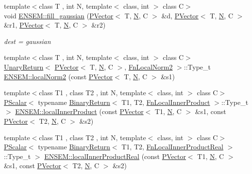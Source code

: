 \begin{DoxyCompactItemize}
{\footnotesize template$<$class T , int N, template$<$ class, int $>$ class C$>$ }\\void \mbox{\hyperlink{group__primvector_ga54096af2b60c9427d37bd363286b820f}{E\+N\+S\+E\+M\+::fill\+\_\+gaussian}} (\mbox{\hyperlink{classENSEM_1_1PVector}{P\+Vector}}$<$ T, \mbox{\hyperlink{operator__name__util_8cc_a7722c8ecbb62d99aee7ce68b1752f337}{N}}, C $>$ \&d, \mbox{\hyperlink{classENSEM_1_1PVector}{P\+Vector}}$<$ T, \mbox{\hyperlink{operator__name__util_8cc_a7722c8ecbb62d99aee7ce68b1752f337}{N}}, C $>$ \&r1, \mbox{\hyperlink{classENSEM_1_1PVector}{P\+Vector}}$<$ T, \mbox{\hyperlink{operator__name__util_8cc_a7722c8ecbb62d99aee7ce68b1752f337}{N}}, C $>$ \&r2)
\begin{DoxyCompactList}\small\item\em dest = gaussian \end{DoxyCompactList}\item 
{\footnotesize template$<$class T , int N, template$<$ class, int $>$ class C$>$ }\\\mbox{\hyperlink{structENSEM_1_1UnaryReturn}{Unary\+Return}}$<$ \mbox{\hyperlink{classENSEM_1_1PVector}{P\+Vector}}$<$ T, \mbox{\hyperlink{operator__name__util_8cc_a7722c8ecbb62d99aee7ce68b1752f337}{N}}, C $>$, \mbox{\hyperlink{structENSEM_1_1FnLocalNorm2}{Fn\+Local\+Norm2}} $>$\+::Type\+\_\+t \mbox{\hyperlink{group__primvector_ga50edf2bff5393989dac9f89e511257be}{E\+N\+S\+E\+M\+::local\+Norm2}} (const \mbox{\hyperlink{classENSEM_1_1PVector}{P\+Vector}}$<$ T, \mbox{\hyperlink{operator__name__util_8cc_a7722c8ecbb62d99aee7ce68b1752f337}{N}}, C $>$ \&s1)
\item 
{\footnotesize template$<$class T1 , class T2 , int N, template$<$ class, int $>$ class C$>$ }\\\mbox{\hyperlink{classENSEM_1_1PScalar}{P\+Scalar}}$<$ typename \mbox{\hyperlink{structENSEM_1_1BinaryReturn}{Binary\+Return}}$<$ T1, T2, \mbox{\hyperlink{structENSEM_1_1FnLocalInnerProduct}{Fn\+Local\+Inner\+Product}} $>$\+::Type\+\_\+t $>$ \mbox{\hyperlink{group__primvector_gabdc482461364fd471e22ddd6c0e1c2dd}{E\+N\+S\+E\+M\+::local\+Inner\+Product}} (const \mbox{\hyperlink{classENSEM_1_1PVector}{P\+Vector}}$<$ T1, \mbox{\hyperlink{operator__name__util_8cc_a7722c8ecbb62d99aee7ce68b1752f337}{N}}, C $>$ \&s1, const \mbox{\hyperlink{classENSEM_1_1PVector}{P\+Vector}}$<$ T2, \mbox{\hyperlink{operator__name__util_8cc_a7722c8ecbb62d99aee7ce68b1752f337}{N}}, C $>$ \&s2)
\item 
{\footnotesize template$<$class T1 , class T2 , int N, template$<$ class, int $>$ class C$>$ }\\\mbox{\hyperlink{classENSEM_1_1PScalar}{P\+Scalar}}$<$ typename \mbox{\hyperlink{structENSEM_1_1BinaryReturn}{Binary\+Return}}$<$ T1, T2, \mbox{\hyperlink{structENSEM_1_1FnLocalInnerProductReal}{Fn\+Local\+Inner\+Product\+Real}} $>$\+::Type\+\_\+t $>$ \mbox{\hyperlink{group__primvector_gad425d93792f21129cff7411c89c12d80}{E\+N\+S\+E\+M\+::local\+Inner\+Product\+Real}} (const \mbox{\hyperlink{classENSEM_1_1PVector}{P\+Vector}}$<$ T1, \mbox{\hyperlink{operator__name__util_8cc_a7722c8ecbb62d99aee7ce68b1752f337}{N}}, C $>$ \&s1, const \mbox{\hyperlink{classENSEM_1_1PVector}{P\+Vector}}$<$ T2, \mbox{\hyperlink{operator__name__util_8cc_a7722c8ecbb62d99aee7ce68b1752f337}{N}}, C $>$ \&s2)

\end{DoxyCompactItemize}
